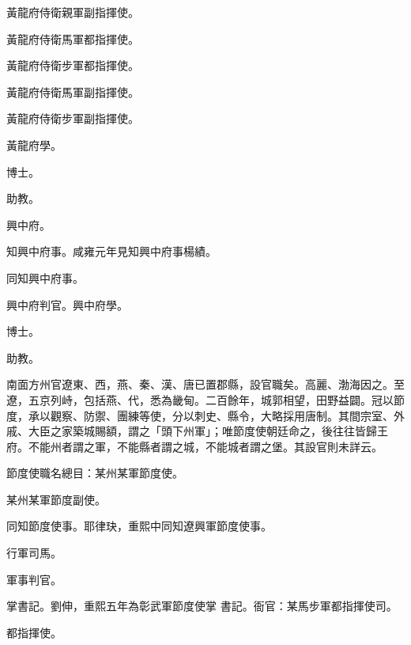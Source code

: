 \begin{pinyinscope}
 黃龍府侍衛親軍副指揮使。



 黃龍府侍衛馬軍都指揮使。



 黃龍府侍衛步軍都指揮使。



 黃龍府侍衛馬軍副指揮使。



 黃龍府侍衛步軍副指揮使。



 黃龍府學。



 博士。



 助教。



 興中府。



 知興中府事。咸雍元年見知興中府事楊績。



 同知興中府事。



 興中府判官。興中府學。



 博士。



 助教。



 南面方州官遼東、西，燕、秦、漢、唐已置郡縣，設官職矣。高麗、渤海因之。至遼，五京列峙，包括燕、代，悉為畿甸。二百餘年，城郭相望，田野益闢。冠以節度，承以觀察、防禦、團練等使，分以刺史、縣令，大略採用唐制。其間宗室、外戚、大臣之家築城賜額，謂之「頭下州軍」；唯節度使朝廷命之，後往往皆歸王府。不能州者謂之軍，不能縣者謂之城，不能城者謂之堡。其設官則未詳云。



 節度使職名總目：某州某軍節度使。



 某州某軍節度副使。



 同知節度使事。耶律玦，重熙中同知遼興軍節度使事。



 行軍司馬。



 軍事判官。



 掌書記。劉伸，重熙五年為彰武軍節度使掌
 書記。衙官：某馬步軍都指揮使司。



 都指揮使。




\end{pinyinscope}
